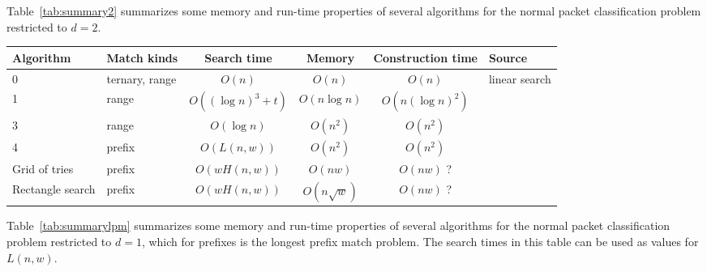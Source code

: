 \documentclass[acmsmall]{acmart}
\begin{document}
Table~\ref{tab:summary2} summarizes some memory and run-time properties of several algorithms for the normal packet classification problem restricted to $d=2$.

\begin{table*}
  \caption{Algorithms for normal packet classification problem with $d=2$}
  \label{tab:summary2}
  \begin{tabular}{llcccl}
    \toprule
    
      Algorithm
    & Match kinds
    & Search time
    & Memory
    & Construction time
    & Source \\
    
    \midrule

      0
    & ternary, range
    & $O(n)$
    & $O(n)$
    & $O(n)$
    & linear search
    \\

      1
    & range
    & $O((\log n)^3 + t)$
    & $O(n \log n )$
    & $O(n (\log n)^2 )$
    & \cite[Thm. 3.2]{Edel1983a}
    \\

      3
    & range
    & $O(\log n)$
    & $O(n^2)$
    & $O(n^2)$
    & \cite[Sec. 2.3]{PS1985}
    \\

      4
    & prefix
    & $O(L(n,w))$
    & $O(n^2)$
    & $O(n^2)$
    & \cite[Sec. 2.3]{PS1985}
    \\

      Grid of tries
    & prefix
    & $O(w H(n,w))$
    & $O(nw)$
    & $O(nw)$ ?
    & \cite{SVSW1998}
    \\

      Rectangle search
    & prefix\footnotemark{}
    & $O(w H(n,w))$
    & $O(n \sqrt{w})$
    & $O(nw)$ ?
    & \cite[Sec. 8]{SSV1999}
    \\

  \bottomrule
\end{tabular}
\end{table*}


Table~\ref{tab:summarylpm} summarizes some memory and run-time properties of several algorithms for the normal packet classification problem restricted to $d=1$, which for
prefixes is the longest prefix match problem.
The search times in this table can be used as values for $L(n,w)$.
\end{document}
